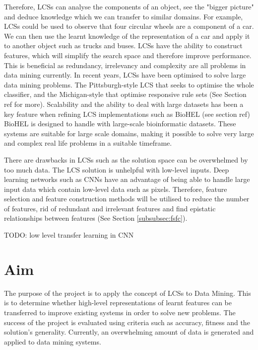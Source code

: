 Therefore, LCSs can analyse the components of an object, see the "bigger picture" and deduce knowledge which we can transfer to similar domains. For example, LCSs could be used to observe that four circular wheels are a component of a car. We can then use the learnt knowledge of the representation of a car and apply it to another object such as trucks and buses. LCSs have the ability to construct features, which will simplify the search space and therefore improve performance. This is beneficial as redundancy, irrelevancy and complexity are all problems in data mining currently. In recent years, LCSs have been optimised to solve large data mining problems. The Pittsburgh-style LCS that seeks to optimise the whole classifier, and the Michigan-style that optimise responsive rule sets \cite{brownlee2011clever} (See Section ref for more). Scalability and the ability to deal with large datasets has been a key feature when refining LCS implementations such as BioHEL (see section ref) BioHEL is designed to handle with large-scale bioinformatic datasets. These systems are suitable for large scale domains, making it possible to solve very large and complex real life problems in a suitable timeframe.

There are drawbacks in LCSs such as the solution space can be overwhelmed by too much data. The LCS solution is unhelpful with low-level inputs. Deep learning networks such as CNNs have an advantage of being able to handle large input data which contain low-level data such as pixels. Therefore, feature selection and feature construction methods will be utilised to reduce the number of features, rid of redundant and irrelevant features and find epistatic relationships between features \cite{urbanowicz2017introduction}(See Section \ref{subsubsec:fsfc}).

 TODO: low level transfer learning in CNN

\section{Aim}

The purpose of the project is to apply the concept of LCSs to Data Mining. This is to determine whether high-level representations of learnt features can be transferred to improve existing systems in order to solve new problems. The success of the project is evaluated using criteria such as accuracy, fitness and the solution's generality. Currently, an overwhelming amount of data is generated and applied to data mining systems. 

